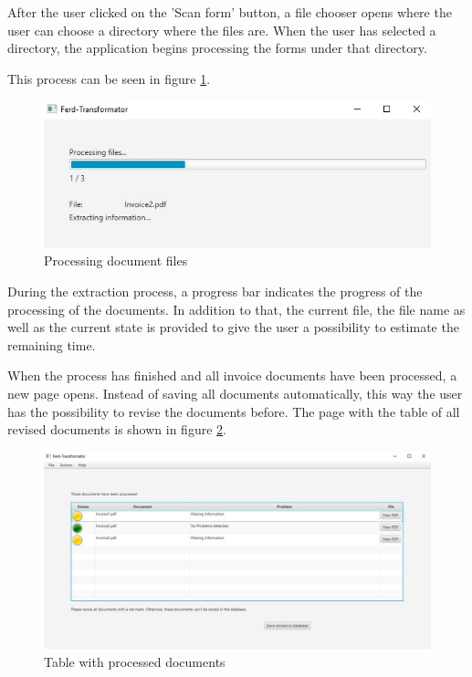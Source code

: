 After the user clicked on the 'Scan form' button, a file chooser opens where the user can choose a directory where the files are. When the user has selected a directory, the application begins processing the forms under that directory.

This process can be seen in figure \ref{processingFiles}.

\begin{figure}[ht!]
\centering
\includegraphics[scale=0.6]{Images/GUI/processingFiles.jpg}
\caption{Processing document files \label{processingFiles}}
\end{figure}

During the extraction process, a progress bar indicates the progress of the processing of the documents. In addition to that, the current file, the file name as well as the current state is provided to give the user a possibility to estimate the remaining time.

When the process has finished and all invoice documents have been processed, a new page opens. Instead of saving all documents automatically, this way the user has the possibility to revise the documents before.
The page with the table of all revised documents is shown in figure \ref{reviseBeforeSafe}.

\begin{figure}[ht!]
\centering
\includegraphics[width=\textwidth]{Images/GUI/reviseBeforeSafe.jpg}
\caption{Table with processed documents \label{reviseBeforeSafe}}
\end{figure}

